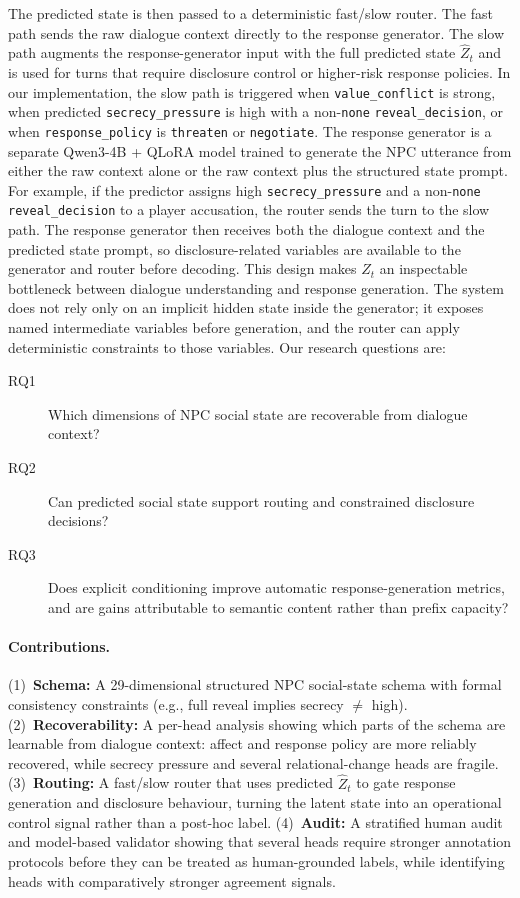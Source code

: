 \documentclass[11pt]{article}
\begin{document}
The predicted state is then passed to a deterministic fast/slow router. The fast path sends the raw dialogue context directly to the response generator. The slow path augments the response-generator input with the full predicted state $\hat{Z}_t$ and is used for turns that require disclosure control or higher-risk response policies. In our implementation, the slow path is triggered when \texttt{value\_conflict} is strong, when predicted \texttt{secrecy\_pressure} is high with a non-\texttt{none} \texttt{reveal\_decision}, or when \texttt{response\_policy} is \texttt{threaten} or \texttt{negotiate}. The response generator is a separate Qwen3-4B + QLoRA model trained to generate the NPC utterance from either the raw context alone or the raw context plus the structured state prompt.
For example, if the predictor assigns high \texttt{secrecy\_pressure} and a non-\texttt{none} \texttt{reveal\_decision} to a player accusation, the router sends the turn to the slow path. The response generator then receives both the dialogue context and the predicted state prompt, so disclosure-related variables are available to the generator and router before decoding.
This design makes $Z_t$ an inspectable bottleneck between dialogue understanding and response generation. The system does not rely only on an implicit hidden state inside the generator; it exposes named intermediate variables before generation, and the router can apply deterministic constraints to those variables.
Our research questions are:

\begin{description}
    \item[RQ1] Which dimensions of NPC social state are recoverable from dialogue context?
    \item[RQ2] Can predicted social state support routing and constrained disclosure decisions?
    \item[RQ3] Does explicit conditioning improve automatic response-generation metrics, and are gains attributable to semantic content rather than prefix capacity?
\end{description}

\paragraph{Contributions.}
(1)~\textbf{Schema:} A 29-dimensional structured NPC social-state schema with formal consistency constraints (e.g., full reveal implies secrecy $\neq$ high).
(2)~\textbf{Recoverability:} A per-head analysis showing which parts of the schema are learnable from dialogue context: affect and response policy are more reliably recovered, while secrecy pressure and several relational-change heads are fragile.
(3)~\textbf{Routing:} A fast/slow router that uses predicted $\hat{Z}_t$ to gate response generation and disclosure behaviour, turning the latent state into an operational control signal rather than a post-hoc label.
(4)~\textbf{Audit:} A stratified human audit and model-based validator showing that several heads require stronger annotation protocols before they can be treated as human-grounded labels, while identifying heads with comparatively stronger agreement signals.
\end{document}
